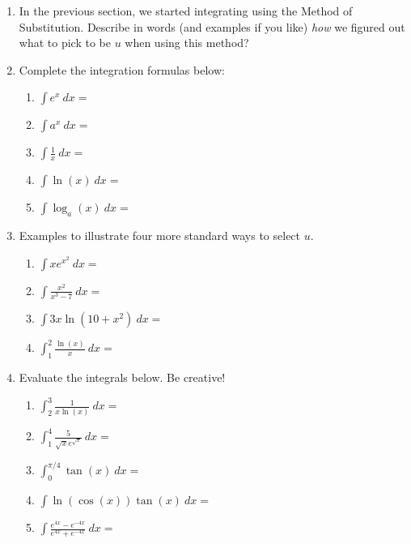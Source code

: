 \documentclass[11pt,fleqn]{article}
\def\ds{\displaystyle}
\begin{document}
\vspace*{-0.7in}

\begin{center}
  \Large{}
  \end{center}
\begin{enumerate}
\item In the previous section, we started integrating using the Method of Substitution. Describe in words (and examples if you like) \emph{how} we figured out what to pick to be $u$ when using this method?
\vspace{1in}
\item Complete the integration formulas below:
	\begin{multicols}{2}
	\begin{enumerate}
	\item $\ds{\int e^x\: dx}=$
	\item $\ds{\int a^x\: dx}=$
	\item $\ds{\int \frac{1}{x}\: dx}=$
	\item $\ds{\int \ln(x) \: dx}=$\\
	
	\item $\ds{\int \log_a(x) \: dx}=$\\
	\end{enumerate}
	\end{multicols}
\item Examples to illustrate four more standard ways to select $u.$
	\begin{enumerate}
	\item $\ds{\int xe^{x^2}\: dx}=$
	\vfill
	\item $\ds{\int \frac{x^2}{x^3-7}\: dx}=$
	\vfill
	\item $\ds{\int 3x \ln(10+x^2)\: dx}=$
	\vfill
	\item $\ds{\int_1^2 \frac{\ln(x)}{x}\: dx}=$
	\vfill
	\end{enumerate}
\newpage
\item Evaluate the integrals below. Be creative!
\begin{enumerate}
	\item $\ds{\int_2^3 \frac{1}{x \ln(x)} \: dx}=$
	\vfill
	\item $\ds{\int_1^4 \frac{5}{\sqrt{x}e^{\sqrt{x}}} \: dx}=$
	\vfill
	\item $\ds{\int_0^{\pi/4} \tan(x) \: dx}=$
	\vfill
	\item $\ds{\int \ln(\cos(x)) \tan(x) \: dx}=$
	\vfill
	\item $\ds{\int\frac{e^{4x} - e^{-4x}}{e^{4x} + e^{-4x}} \: dx}=$
	\vfill
\end{enumerate}
	
\end{enumerate}
\end{document}
